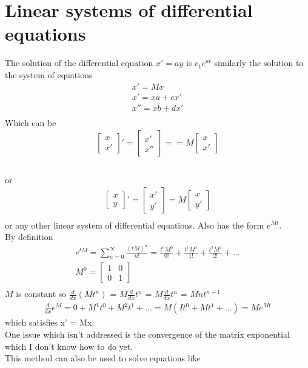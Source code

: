 \documentclass{article}
\begin{document}
\section*{Linear systems of differential equations}
The solution of the differential equation $x' = ay$ is $c_1 e^{at}$ similarly the solution to the system of equations \\
\begin{gather}
x' = Mx \\
x' = xa + cx' \\
x'' = xb + dx'\\
\end{gather}
Which can be 
\begin{gather}
\begin{bmatrix} x \\ x' \end{bmatrix}' =
\begin{bmatrix} x' \\ x'' \end{bmatrix} ==
M\begin{bmatrix} x \\ x' \end{bmatrix}\\
\end{gather} \\
or
\begin{gather}
\begin{bmatrix} x \\ y \end{bmatrix}' =
\begin{bmatrix} x' \\ y' \end{bmatrix} =
M\begin{bmatrix} x \\ y' \end{bmatrix}\\
\end{gather}
or any other linear system of differential equations. Also has the form $e^{Mt}$. \\
By definition
\begin{gather}
e^{tM} = \sum_{n=0}^\infty \frac{(tM)^n}{n!} = \frac{t^0M^0}{0!} + \frac{t^1M^1}{1!} +\frac{ t^2M^2}{2!} + ... \\
M^0 = \begin{bmatrix} 1 & 0 \\ 0 & 1 \end{bmatrix} \\
\end{gather}
$M$ is constant so $\frac{d}{dx}(Mt^n)$ = $M\frac{d}{dx}t^n$ = $M\frac{d}{dx}t^n$ = $Mnt^{n-1}$
\begin{gather}
\frac{d}{dx} e^M = 0 + M^1t^0 + M^2t^1 + ... = M(It^0 + Mt^1 + ...) = Me^{Mt}
\end{gather}
which satisfies x' = Mx. \\
One issue which isn't addressed is the convergence of the matrix exponential which I don't know how to do yet.
\\
This method can also be used to solve equations like
\end{document}

